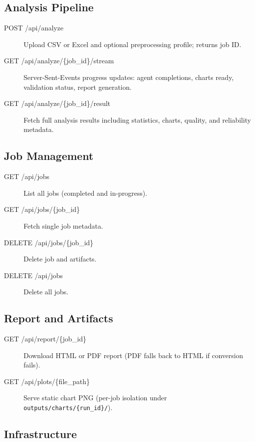 \subsection{Analysis Pipeline}

\begin{description}
	\item[POST /api/analyze] Upload CSV or Excel and optional preprocessing profile; returns job ID.
	\item[GET /api/analyze/\{job\_id\}/stream] Server-Sent-Events progress updates: agent completions, charts ready, validation status, report generation.
	\item[GET /api/analyze/\{job\_id\}/result] Fetch full analysis results including statistics, charts, quality, and reliability metadata.
\end{description}

\subsection{Job Management}

\begin{description}
	\item[GET /api/jobs] List all jobs (completed and in-progress).
	\item[GET /api/jobs/\{job\_id\}] Fetch single job metadata.
	\item[DELETE /api/jobs/\{job\_id\}] Delete job and artifacts.
	\item[DELETE /api/jobs] Delete all jobs.
\end{description}

\subsection{Report and Artifacts}

\begin{description}
	\item[GET /api/report/\{job\_id\}] Download HTML or PDF report (PDF falls back to HTML if conversion fails).
	\item[GET /api/plots/\{file\_path\}] Serve static chart PNG (per-job isolation under \texttt{outputs/charts/\{run\_id\}/}).
\end{description}

\subsection{Infrastructure}

